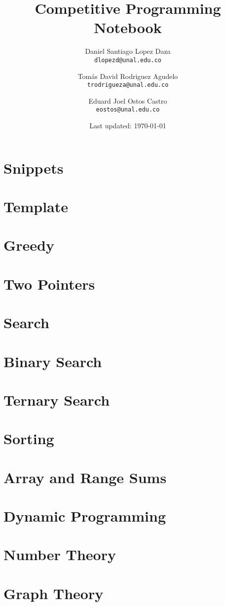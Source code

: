 \documentclass[landscape, 9pt]{article}
\title{Competitive Programming Notebook} %
\author{
 Daniel Santiago Lopez Daza\\
   \texttt{dlopezd@unal.edu.co}
  \and
  Tomás David Rodriguez Agudelo\\
  \texttt{trodrigueza@unal.edu.co}
  \and
  Eduard Joel Ostos Castro\\
    \texttt{eostos@unal.edu.co}
}
\date{Last updated: \today}
\begin{document}
\maketitle
\newpage
\tableofcontents
\newpage
\begin{multicols}{2}
\section{Snippets}
\newpage
\section{Template}




\section{Greedy}
\newpage
\section{Two Pointers}
\newpage
\section{Search}
\newpage
\section*{Binary Search}
\newpage
\section*{Ternary Search}
\newpage
\section{Sorting}
\newpage
\section{Array and Range Sums}
\newpage
\section{Dynamic Programming}
\newpage
\section{Number Theory}
\newpage
\section{Graph Theory}
\end{multicols}
\end{document}

